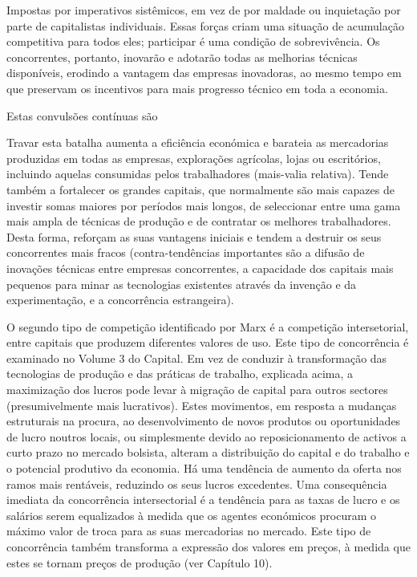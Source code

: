  \par 
Impostas por imperativos sistêmicos, em vez de por maldade ou inquietação por parte de capitalistas individuais. Essas forças criam uma situação de acumulação competitiva para todos eles; participar é uma condição de sobrevivência. Os concorrentes, portanto, inovarão e adotarão todas as melhorias técnicas disponíveis, erodindo a vantagem das empresas inovadoras, ao mesmo tempo em que preservam os incentivos para mais progresso técnico em toda a economia.
 \par 
Estas convulsões contínuas são
 \par 
Travar esta batalha aumenta a eficiência económica e barateia as mercadorias produzidas em todas as empresas, explorações agrícolas, lojas ou escritórios, incluindo aquelas consumidas pelos trabalhadores (mais-valia relativa). Tende também a fortalecer os grandes capitais, que normalmente são mais capazes de investir somas maiores por períodos mais longos, de seleccionar entre uma gama mais ampla de técnicas de produção e de contratar os melhores trabalhadores. Desta forma, reforçam as suas vantagens iniciais e tendem a destruir os seus concorrentes mais fracos (contra-tendências importantes são a difusão de inovações técnicas entre empresas concorrentes, a capacidade dos capitais mais pequenos para minar as tecnologias existentes através da invenção e da experimentação, e a concorrência estrangeira).
 \par 
O segundo tipo de competição identificado por Marx é a competição intersetorial, entre capitais que produzem diferentes valores de uso. Este tipo de concorrência é examinado no Volume {\color{blue}3} do Capital. Em vez de conduzir à transformação das tecnologias de produção e das práticas de trabalho, explicada acima, a maximização dos lucros pode levar à migração de capital para outros sectores (presumivelmente mais lucrativos). Estes movimentos, em resposta a mudanças estruturais na procura, ao desenvolvimento de novos produtos ou oportunidades de lucro noutros locais, ou simplesmente devido ao reposicionamento de activos a curto prazo no mercado bolsista, alteram a distribuição do capital e do trabalho e o potencial produtivo da economia. Há uma tendência de aumento da oferta nos ramos mais rentáveis, reduzindo os seus lucros excedentes. Uma consequência imediata da concorrência intersectorial é a tendência para as taxas de lucro e os salários serem equalizados à medida que os agentes económicos procuram o máximo valor de troca para as suas mercadorias no mercado. Este tipo de concorrência também transforma a expressão dos valores em preços, à medida que estes se tornam preços de produção (ver Capítulo {\color{blue}10}).

